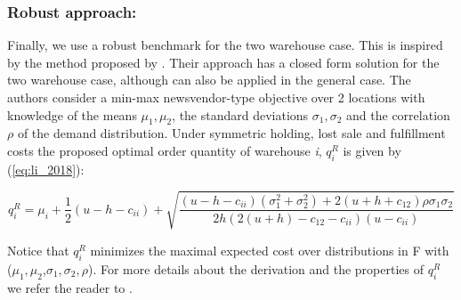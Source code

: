 \documentclass[poms,final,blindrev]{poms1_V1} %
\begin{document}
\subsubsection*{Robust approach:}
Finally, we use a robust benchmark for the two warehouse case. This is inspired by the method proposed by \cite{govindarajan2019distribution}. Their approach has a closed form solution for the two warehouse case, although can also be applied in the general case. The authors consider a min-max newsvendor-type objective over 2 locations with knowledge of the means $\mu_1,\mu_2$, the standard deviations $\sigma_1,\sigma_2 $ and the correlation $\rho$ of the demand distribution.
Under symmetric holding, lost sale and fulfillment costs the proposed optimal order quantity of warehouse \textit{i}, $q^{R}_{i}$ is given by (\ref{eq:li_2018}):

\begin{equation}\label{eq:li_2018}
q^{R}_{i}= \mu_i + \frac{1}{2}(u - h - c_{ii} ) + \sqrt{ \frac{ (u-h - c_{ii}) (\sigma^2_1 + \sigma^2_2  ) + 2(u +h +c_{12}) \rho \sigma_1 \sigma_2}{2h( 2(u+h) - c_{12} - c_{ii} )(u-c_{ii}) }}
\end{equation}

Notice that $q^{R}_{i}$ minimizes the maximal expected cost over distributions in F with ($\mu_1,\mu_2$,$\sigma_1,\sigma_2,\rho$).
For more details about the derivation and the properties of $q^{R}_{i}$ we refer the reader to \cite{govindarajan2019distribution}.



\end{document}

